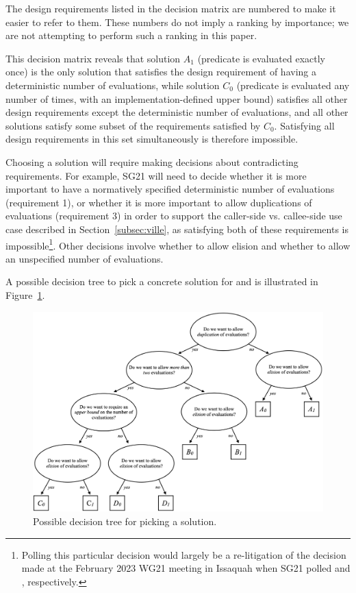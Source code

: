 The design requirements listed in the decision matrix are numbered to make it easier to refer to them. These numbers do not imply a ranking by importance; we are not attempting to perform such a ranking in this paper.

This decision matrix reveals that solution $A_1$ (predicate is evaluated exactly once) is the only solution that satisfies the design requirement of having a deterministic number of evaluations, while solution $C_0$ (predicate is evaluated any number of times, with an implementation-defined upper bound) satisfies all other design requirements except the deterministic number of evaluations, and all other solutions satisfy some subset of the requirements satisfied by $C_0$. Satisfying all design requirements in this set simultaneously is therefore impossible.

Choosing a solution will require making decisions about contradicting requirements. For example, SG21 will need to decide  whether it is more important to have a normatively specified deterministic number of evaluations (requirement 1), or whether it is more important to allow duplications of evaluations (requirement 3) in order to support the caller-side vs. callee-side use case described in Section~\ref{subsec:ville}, as satisfying both of these requirements is impossible\footnote{Polling this particular decision would largely be a re-litigation of the decision made at the February 2023 WG21 meeting in Issaquah when SG21 polled \cite{P2756R0} and \cite{P2751R1}, respectively.}. Other decisions involve whether to allow elision and whether to allow an unspecified number of evaluations.

A possible decision tree to pick a concrete solution for  and  is illustrated in Figure~\ref{fig:prepost}.

\begin{figure}%
\centering
  \includegraphics[width=1\linewidth]{images/p3228_fig1.png}
  \vspace{2mm}
  \caption{Possible decision tree for picking a solution.}
  \label{fig:prepost}
\end{figure}


